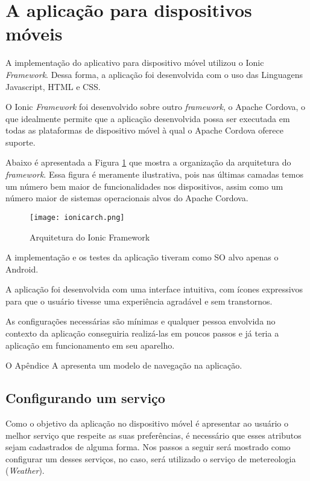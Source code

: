 \section{A aplicação para dispositivos móveis}
A implementação do aplicativo para dispositivo móvel utilizou o Ionic \textit{Framework}. Dessa forma, a aplicação foi desenvolvida com o uso das Linguagens Javascript, HTML e CSS.

O Ionic \textit{Framework} foi desenvolvido sobre outro \textit{framework}, o Apache Cordova, o que idealmente permite que a aplicação desenvolvida possa ser executada em todas as plataformas de dispositivo móvel à qual o Apache Cordova oferece suporte.

Abaixo é apresentada a Figura \ref{fig:ionicarch} que mostra a organização da arquitetura do \textit{framework}. Essa figura é meramente ilustrativa, pois nas últimas camadas temos um número bem maior de funcionalidades nos dispositivos, assim como um número maior de sistemas operacionais alvos do Apache Cordova.

\begin{figure}[!htb]
  \centering
  \texttt{[image: ionicarch.png]} %
  \caption[Arquitetura do Ionic Framework]{Arquitetura do Ionic Framework}
  \label{fig:ionicarch}
\end{figure}

A implementação e os testes da aplicação tiveram como SO alvo apenas o Android.

A aplicação foi desenvolvida com uma interface intuitiva, com ícones expressivos para que o usuário tivesse uma experiência agradável e sem transtornos.

As configurações necessárias são mínimas e qualquer pessoa envolvida no contexto da aplicação conseguiria realizá-las em poucos passos e já teria a aplicação em funcionamento em seu aparelho.

O Apêndice A apresenta um modelo de navegação na aplicação.

\subsection{Configurando um serviço}
Como o objetivo da aplicação no dispositivo móvel é apresentar ao usuário o melhor serviço que respeite as suas preferências, é necessário que esses atributos sejam cadastrados de alguma forma. Nos passos a seguir será mostrado como configurar um desses serviços, no caso, será utilizado o serviço de metereologia (\textit{Weather}).

